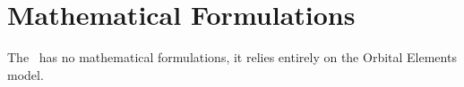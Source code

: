 %
%
% 
%

\section{Mathematical Formulations}
The \OrbElemDesc\ has no mathematical formulations, it relies entirely on the Orbital Elements model.